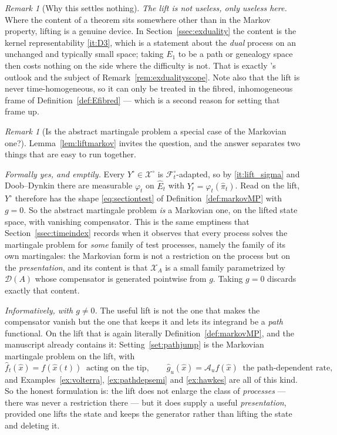 \documentclass[11pt,a4paper]{article}
\theoremstyle{plain}
\theoremstyle{definition}
\theoremstyle{remark}
\newtheorem{remark}[theorem]{Remark}
\newcommand{\dom}{\mathcal{D}}                 %
\newcommand{\Filt}{\mathcal{F}}
\newcommand{\DGP}{\cite{DGP24}}
\newcommand{\XX}{\mathcal{X}}                  %
\begin{document}
\begin{remark}[Why this settles nothing]
  \emph{The lift is not useless, only useless here.}  Where the content of a
  theorem sits somewhere other than in the Markov property, lifting is a genuine
  device.  In Section~\ref{ssec:exduality} the content is the kernel
  representability \ref{it:D3}, which is a statement about the \emph{dual}
  process on an unchanged and typically small space; taking $E_1$ to be a path or
  genealogy space then costs nothing on the side where the difficulty is not.
  That is exactly \DGP's outlook and the subject of
  Remark~\ref{rem:exdualityscope}.  Note also that the lift is never
  time-homogeneous, so it can only be treated in the fibred, inhomogeneous frame
  of Definition~\ref{def:Efibred} --- which is a second reason for setting that
  frame up.
\end{remark}

\begin{remark}[Is the abstract martingale problem a special case of the Markovian one?]
  \label{rem:liftform}
  Lemma~\ref{lem:liftmarkov} invites the question, and the answer separates two
  things that are easy to run together.

  \emph{Formally yes, and emptily.}  Every $Y^\circ \in \XX^\circ$ is
  $\Filt^\circ_t$-adapted, so by \ref{it:lift_sigma} and Doob--Dynkin there are
  measurable $\varphi_t$ on $\hat{E}_t$ with $Y^\circ_t = \varphi_t(\hat\pi_t)$.
  Read on the lift, $Y^\circ$ therefore has the shape \eqref{eq:sectiontest} of
  Definition~\ref{def:markovMP} with $g = 0$.  So the abstract martingale problem
  \emph{is} a Markovian one, on the lifted state space, with vanishing
  compensator.  This is the same emptiness that Section~\ref{ssec:timeindex}
  records when it observes that every process solves the martingale problem for
  \emph{some} family of test processes, namely the family of its own martingales:
  the Markovian form is not a restriction on the process but on the
  \emph{presentation}, and its content is that $\XX_A$ is a small family
  parametrized by $\dom(A)$ whose compensator is generated pointwise from $g$.
  Taking $g = 0$ discards exactly that content.

  \emph{Informatively, with $g \neq 0$.}  The useful lift is not the one that
  makes the compensator vanish but the one that keeps it and lets its integrand be
  a \emph{path} functional.  On the lift that is again literally
  Definition~\ref{def:markovMP}, and the manuscript already contains it:
  Setting~\ref{set:pathjump} is the Markovian martingale problem on the lift,
  with
  \[
    \hat{f}_t(\hat{x}) = f(\hat{x}(t)) \ \text{ acting on the tip} ,
    \qquad
    \hat{g}_u(\hat{x}) = \mathcal{A}_u f(\hat{x}) \ \text{ the path-dependent rate} ,
  \]
  and Examples~\ref{ex:volterra}, \ref{ex:pathdepsemi} and \ref{ex:hawkes} are all
  of this kind.  So the honest formulation is: the lift does not enlarge the class
  of \emph{processes} --- there was never a restriction there --- but it does
  supply a useful \emph{presentation}, provided one lifts the state and keeps the
  generator rather than lifting the state and deleting it.


\end{remark}
\end{document}
